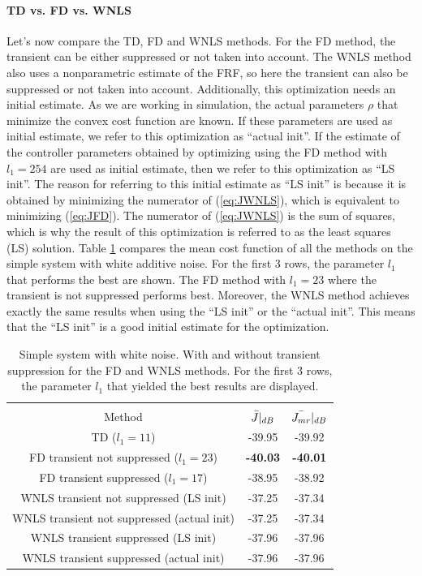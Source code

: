 \newpage
\paragraph{TD vs. FD vs. WNLS}
Let's now compare the TD, FD and WNLS methods. For the FD method, the transient can be either suppressed or not taken into account. The WNLS method also uses a nonparametric estimate of the FRF, so here the transient can also be suppressed or not taken into account. Additionally, this optimization needs an initial estimate. As we are working in simulation, the actual parameters $\rho$ that minimize the convex cost function are known. If these parameters are used as initial estimate, we refer to this optimization as ``actual init''. If the estimate of the controller parameters obtained by optimizing using the FD method with $l_1 = 254$ are used as initial estimate, then we refer to this optimization as ``LS init''. The reason for referring to this initial estimate as ``LS init'' is because it is obtained by minimizing the numerator of (\ref{eq:JWNLS}), which is equivalent to minimizing (\ref{eq:JFD}). The numerator of (\ref{eq:JWNLS}) is the sum of squares, which is why the result of this optimization is referred to as the least squares (LS) solution. Table \ref{tab:simple_white_transient_with_without_TD_vs_FD_vs_WNLS} compares the mean cost function of all the methods on the simple system with white additive noise. For the first 3 rows, the parameter $l_1$ that performs the best are shown. The FD method with $l_1 = 23$ where the transient is not suppressed performs best. Moreover, the WNLS method achieves exactly the same results when using the ``LS init'' or the ``actual init''. This means that the ``LS init'' is a good initial estimate for the optimization.

\begin{table}[H]
\centering
\begin{tabular}{|ccc|}
\hline
&&\\[-2.5ex]
Method & $\Bar{J}|_{dB}$ & $\Bar{J_{mr}}|_{dB}$ \\
\hline
TD ($l_1 = 11$) & -39.95 & -39.92 \\
FD transient not suppressed ($l_1 = 23$) & \textbf{-40.03} & \textbf{-40.01} \\
FD transient suppressed ($l_1 = 17$) & -38.95 & -38.92 \\
WNLS transient not suppressed (LS init) & -37.25 & -37.34 \\
WNLS transient not suppressed (actual init) & -37.25 & -37.34 \\
WNLS transient suppressed (LS init) & -37.96 & -37.96 \\
WNLS transient suppressed (actual init) & -37.96 & -37.96 \\
\hline
\end{tabular}
\caption{Simple system with white noise. With and without transient suppression for the FD and WNLS methods. For the first 3 rows, the parameter $l_1$ that yielded the best results are displayed.}
\label{tab:simple_white_transient_with_without_TD_vs_FD_vs_WNLS}
\end{table}

